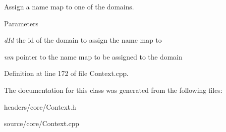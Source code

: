 Assign a name map to one of the domains. 


\begin{DoxyParams}{Parameters}
\item[{\em dId}]the id of the domain to assign the name map to \item[{\em nm}]pointer to the name map to be assigned to the domain \end{DoxyParams}


Definition at line 172 of file Context.cpp.



The documentation for this class was generated from the following files:\begin{DoxyCompactItemize}
\item 
headers/core/Context.h\item 
source/core/Context.cpp\end{DoxyCompactItemize}
